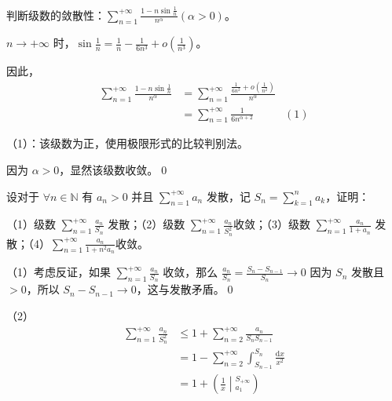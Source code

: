 \begin{ques}
	判断级数的敛散性：$\displaystyle \sum _{n=1}^{+\infty }\frac{1-n\sin\frac{1}{n}}{n^{\alpha }}( \alpha  >0)$。
\end{ques}



$\displaystyle n\rightarrow +\infty $ 时，$\displaystyle \sin\frac{1}{n} =\frac{1}{n} -\frac{1}{6n^{3}} +o\left(\frac{1}{n^{3}}\right)$。

因此，
\begin{align*}
	\sum _{n=1}^{+\infty }\frac{1-n\sin\frac{1}{n}}{n^{\alpha }} & =\sum _{n=1}^{+\infty }\frac{\frac{1}{6n^{2}} +o\left(\frac{1}{n^{2}}\right)}{n^{\alpha }} & \\
	& =\sum _{n=1}^{+\infty }\frac{1}{6n^{\alpha +2}} & ( 1)
\end{align*}

（1）：该级数为正，使用极限形式的比较判别法。

因为 $\displaystyle \alpha  >0$，显然该级数收敛。\qed 





\begin{ques}
	设对于 $\displaystyle \forall n\in \mathbb{N}$ 有 $\displaystyle a_{n}  >0$ 并且 $\displaystyle \sum _{n=1}^{+\infty } a_{n}$ 发散，记 $\displaystyle S_{n} =\sum _{k=1}^{n} a_{k}$，证明：

（1）级数 $\displaystyle \sum _{n=1}^{+\infty }\frac{a_{n}}{S_{n}}$ 发散；（2）级数 $\displaystyle \sum _{n=1}^{+\infty }\frac{a_{n}}{S_{n}^{2}}$收敛；（3）级数 $\displaystyle \sum _{n=1}^{+\infty }\frac{a_{n}}{1+a_{n}}$ 发散；（4）$\displaystyle \sum _{n=1}^{+\infty }\frac{a_{n}}{1+n^{2} a_{n}}$收敛。
\end{ques}





（1）考虑反证，如果 $\displaystyle \sum _{n=1}^{+\infty }\frac{a_{n}}{S_{n}}$ 收敛，那么 $\displaystyle \frac{a_{n}}{S_{n}} =\frac{S_{n} -S_{n-1}}{S_{n}}\rightarrow 0$ 因为 $\displaystyle S_{n}$ 发散且 $\displaystyle  >0$，所以 $\displaystyle S_{n} -S_{n-1}\rightarrow 0$，这与发散矛盾。\qed 



（2）
\begin{align*}
	\sum _{n=1}^{+\infty }\frac{a_{n}}{S_{n}^{2}} & \leqslant 1+\sum _{n=2}^{+\infty }\frac{a_{n}}{S_{n} S_{n-1}}\\
	& =1-\sum _{n=2}^{+\infty }\int _{S_{n-1}}^{S_{n}}\frac{\mathrm{d} x}{x^{2}}\\
	& =1+\left(\frac{1}{x}\middle| _{a_{1}}^{S_{+\infty }}\right)
\end{align*}


